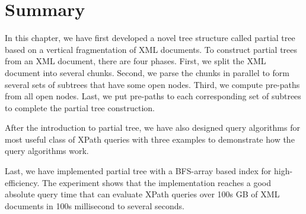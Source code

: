 \section{Summary}

In this chapter, we have first developed a novel tree structure called partial
tree based on a vertical fragmentation of XML documents. To construct partial
trees from an XML document, there are four phases. First, we split the XML
document into several chunks. Second, we parse the chunks in parallel to form
several sets of subtrees that have some open nodes. Third, we compute pre-paths
from all open nodes. Last, we put pre-paths to each corresponding set of
subtrees to complete the partial tree construction.

After the introduction to partial tree, we have also designed query algorithms
for most useful class of XPath queries with three examples to demonstrate how
the query algorithms work.

Last, we have implemented partial tree with a BFS-array based index for high-
efficiency. The experiment shows that the implementation reaches a good absolute
query time that can evaluate XPath queries over 100s GB of XML documents in 100s
millisecond to several seconds.
